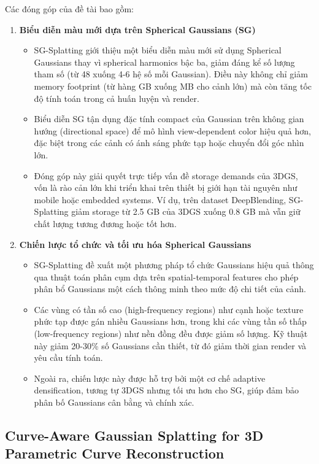 Các đóng góp của đề tài bao gồm:
\begin{enumerate}
    \item \textbf{Biểu diễn màu mới dựa trên Spherical Gaussians (SG)}
    \begin{itemize}
        \item SG-Splatting giới thiệu một biểu diễn màu mới sử dụng Spherical Gaussians thay vì spherical harmonics bậc ba, giảm đáng kể số lượng tham số (từ 48 xuống 4-6 hệ số mỗi Gaussian). Điều này không chỉ giảm memory footprint (từ hàng GB xuống MB cho cảnh lớn) mà còn tăng tốc độ tính toán trong cả huấn luyện và render.
        \item Biểu diễn SG tận dụng đặc tính compact của Gaussian trên không gian hướng (directional space) để mô hình view-dependent color hiệu quả hơn, đặc biệt trong các cảnh có ánh sáng phức tạp hoặc chuyển đổi góc nhìn lớn.
        \item Đóng góp này giải quyết trực tiếp vấn đề storage demands của 3DGS, vốn là rào cản lớn khi triển khai trên thiết bị giới hạn tài nguyên như mobile hoặc embedded systems. Ví dụ, trên dataset DeepBlending, SG-Splatting giảm storage từ 2.5 GB của 3DGS xuống 0.8 GB mà vẫn giữ chất lượng tương đương hoặc tốt hơn.
    \end{itemize}
    \item \textbf{Chiến lược tổ chức và tối ưu hóa Spherical Gaussians}
    \begin{itemize}
        \item SG-Splatting đề xuất một phương pháp tổ chức Gaussians hiệu quả thông qua thuật toán phân cụm dựa trên spatial-temporal features cho phép phân bổ Gaussians một cách thông minh theo mức độ chi tiết của cảnh.
        \item Các vùng có tần số cao (high-frequency regions) như cạnh hoặc texture phức tạp được gán nhiều Gaussians hơn, trong khi các vùng tần số thấp (low-frequency regions) như nền đồng đều được giảm số lượng. Kỹ thuật này giảm 20-30\% số Gaussians cần thiết, từ đó giảm thời gian render và yêu cầu tính toán.
        \item Ngoài ra, chiến lược này được hỗ trợ bởi một cơ chế adaptive densification, tương tự 3DGS nhưng tối ưu hơn cho SG, giúp đảm bảo phân bố Gaussians cân bằng và chính xác.  
    \end{itemize}
\end{enumerate}
\newpage
\subsection{Curve-Aware Gaussian Splatting for 3D Parametric Curve Reconstruction \cite{b5}}
